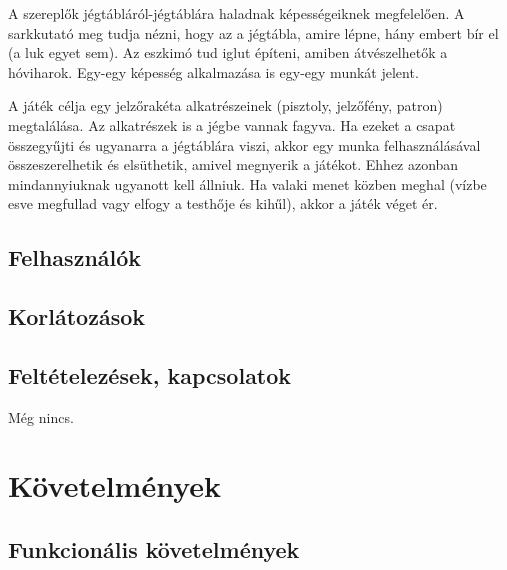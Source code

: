 A szereplők jégtábláról-jégtáblára haladnak képességeiknek megfelelően. A sarkkutató meg tudja nézni, hogy az a jégtábla, amire lépne, hány embert bír el (a luk egyet sem). Az eszkimó tud iglut építeni, amiben átvészelhetők a hóviharok. Egy-egy képesség alkalmazása is egy-egy munkát jelent.

A játék célja egy jelzőrakéta alkatrészeinek (pisztoly, jelzőfény, patron) megtalálása. Az alkatrészek is a jégbe vannak fagyva. Ha ezeket a csapat összegyűjti és ugyanarra a jégtáblára viszi, akkor egy munka felhasználásával összeszerelhetik és elsüthetik, amivel megnyerik a játékot. Ehhez azonban mindannyiuknak ugyanott kell állniuk. Ha valaki menet közben meghal (vízbe esve megfullad vagy elfogy a testhője és kihűl), akkor a játék véget ér. 

\subsection{Felhasználók}

\subsection{Korlátozások}

\subsection{Feltételezések, kapcsolatok}
Még nincs.

\section{Követelmények}
\subsection{Funkcionális követelmények}




